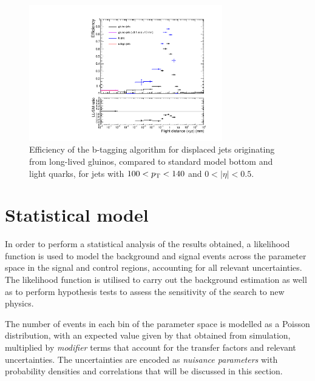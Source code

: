 \begin{figure}[h]
\includegraphics[width=0.75\textwidth]{figs/results/btageff_proper_compressed_pt100_eta0}
\caption{Efficiency of the b-tagging algorithm for displaced jets originating 
from long-lived gluinos, compared to standard model bottom and light quarks, 
for jets with $100 < {p_{\text T}} < 140$ and $0 < |\eta| < 0.5$.}
\label{fig:LL-btagging}
\end{figure}


\section{Statistical model}
\label{sec:results-likelihoodmodel}
In order to perform a statistical analysis of the results obtained, a 
likelihood function is used to model the background and signal events across 
the \njnbhtmht parameter space in the signal and control regions, accounting 
for all relevant uncertainties. The 
likelihood function is utilised to carry out the background estimation as well 
as to perform hypothesis tests to assess the sensitivity of the search to new 
physics.

The number of events in each bin of the \njnbhtmht parameter space is modelled 
as a Poisson distribution, with an expected value given by that obtained from 
simulation, multiplied by \textit{modifier} terms that account for the transfer 
factors and relevant uncertainties. The uncertainties are encoded as 
\textit{nuisance parameters} with probability densities and correlations that 
will be discussed in this section.


